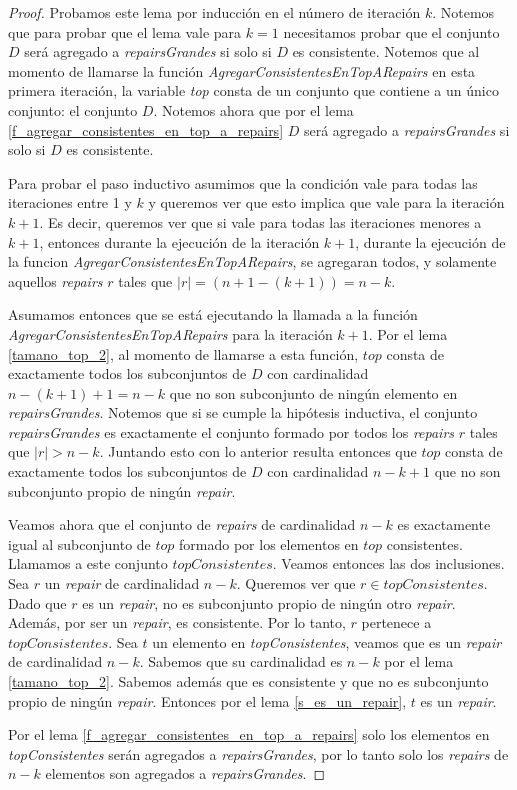 \documentclass[11pt,a4paper,twoside]{tesis}
\begin{document}
\begin{proof}
Probamos este lema por inducción en el número de iteración $k$. Notemos que para probar que el lema vale para $k = 1$ necesitamos probar que el conjunto $D$ será agregado a \textit{repairsGrandes} si solo si $D$ es consistente. Notemos que al momento de llamarse la función \textit{AgregarConsistentesEnTopARepairs} en esta primera iteración, la variable \textit{top} consta de un conjunto que contiene a un único conjunto: el conjunto $D$. Notemos ahora que por el lema \ref{f_agregar_consistentes_en_top_a_repairs} $D$ será agregado a \textit{repairsGrandes} si solo si $D$ es consistente.

Para probar el paso inductivo asumimos que la condición vale para todas las iteraciones entre 1 y $k$ y queremos ver que esto implica que vale para la iteración $k+1$. Es decir, queremos ver que si vale para todas las iteraciones menores a $k+1$, entonces durante la ejecución de la iteración $k+1$, durante la ejecución de la funcion \textit{AgregarConsistentesEnTopARepairs}, se agregaran todos, y solamente aquellos \textit{repairs} $r$ tales que $|r| = (n + 1 - (k+1)) = n - k$.


Asumamos entonces que se está ejecutando la llamada a la función \textit{AgregarConsistentesEnTopARepairs} para la iteración $k+1$. Por el lema \ref{tamano_top_2}, al momento de llamarse a esta función, $top$ consta de exactamente todos los subconjuntos de $D$ con cardinalidad $n - (k + 1) + 1 = n - k$ que no son subconjunto de ningún elemento en \textit{repairsGrandes}. Notemos que si se cumple la hipótesis inductiva, el conjunto \textit{repairsGrandes} es exactamente el conjunto formado por todos los \textit{repairs} $r$ tales que $|r| > n - k$. Juntando esto con lo anterior resulta entonces que $top$ consta de exactamente todos los subconjuntos de $D$ con cardinalidad $n - k + 1$ que no son subconjunto propio de ningún \textit{repair}. 

Veamos ahora que el conjunto de \textit{repairs} de cardinalidad $n-k$ es exactamente igual al subconjunto de $top$ formado por los elementos en $top$ consistentes. Llamamos a este conjunto $topConsistentes$. Veamos entonces las dos inclusiones.
Sea $r$ un \textit{repair} de cardinalidad $n-k$. Queremos ver que $r \in topConsistentes$. Dado que $r$ es un \textit{repair}, no es subconjunto propio de ningún otro \textit{repair}. Además, por ser un \textit{repair}, es consistente. Por lo tanto, $r$ pertenece a $topConsistentes$.
Sea $t$ un elemento en \textit{topConsistentes}, veamos que es un \textit{repair} de cardinalidad $n-k$. Sabemos que su cardinalidad es $n-k$ por el lema \ref{tamano_top_2}. Sabemos además que es consistente y que no es subconjunto propio de ningún \textit{repair}. Entonces por el lema \ref{s_es_un_repair}, $t$ es un \textit{repair}.

Por el lema \ref{f_agregar_consistentes_en_top_a_repairs} solo los elementos en \textit{topConsistentes} serán agregados a \textit{repairsGrandes}, por lo tanto solo los \textit{repairs} de $n-k$ elementos son agregados a \textit{repairsGrandes}.
\end{proof}
\end{document}
